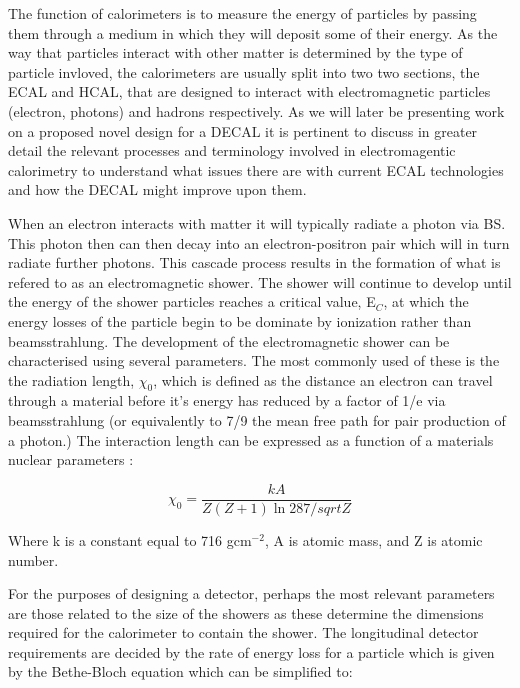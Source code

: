 The function of calorimeters is to measure the energy of particles by passing them through a medium in which they will deposit some of their energy. As the way that particles interact with other matter is determined by the type of particle invloved, the calorimeters are usually split into two two sections, the \ac{ECAL} and \ac{HCAL}, that are designed to interact with electromagnetic particles (electron, photons) and hadrons respectively. As we will later be presenting work on a proposed novel design for a \ac{DECAL} it is pertinent to discuss in greater detail the relevant processes and terminology involved in electromagentic calorimetry to understand what issues there are with current \ac{ECAL} technologies and how the \ac{DECAL} might improve upon them.

When an electron interacts with matter it will typically radiate a photon via \ac{BS}. This photon then can then decay into an electron-positron pair which will in turn radiate further photons. This cascade process results in the formation of what is refered to as an electromagnetic shower. The shower will continue to develop until the energy of the shower particles reaches a critical value, E$_{C}$, at which the energy losses of the particle begin to be dominate by ionization rather than beamsstrahlung. The development of the electromagnetic shower can be characterised using several parameters. The most commonly used of these is the the radiation length, $\chi_0$, which is defined as the distance an electron can travel through a material before it's energy has reduced by a factor of 1/e via beamsstrahlung (or equivalently to 7/9 the mean free path for pair production of a photon.) The interaction length can be expressed as a function of a materials nuclear parameters \cite{Groom:1998it}:

\begin{equation}
  \chi_0= \frac{kA}{Z(Z+1)\ln{287/sqrt{Z}}}
\end{equation}

Where k is a constant equal to 716 gcm$^{-2}$, A is atomic mass, and Z is atomic number.

For the purposes of designing a detector, perhaps the most relevant parameters are those related to the size of the showers as these determine the dimensions required for the calorimeter to contain the shower. The longitudinal detector requirements are decided by the rate of energy loss for a particle which is given by the Bethe-Bloch equation which can be simplified to\cite{Beringer:1900zz}:

